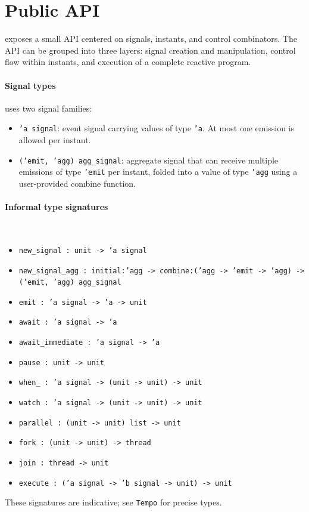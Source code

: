 \section{Public API}
\tempo{} exposes a small API centered on signals, instants, and control
combinators. The API can be grouped into three layers: signal creation and
manipulation, control flow within instants, and execution of a complete
reactive program.

\paragraph{Signal types}
\tempo{} uses two signal families:
\begin{itemize}
\item \texttt{'a signal}: event signal carrying values of type \texttt{'a}.
  At most one emission is allowed per instant.
\item \texttt{('emit, 'agg) agg\_signal}: aggregate signal that can receive
  multiple emissions of type \texttt{'emit} per instant, folded into a value
  of type \texttt{'agg} using a user-provided combine function.
\end{itemize}

\paragraph{Informal type signatures}\mbox{}\\
\begin{itemize}
\item \texttt{new\_signal : unit -> 'a signal}
\item \texttt{new\_signal\_agg : initial:'agg -> combine:('agg -> 'emit -> 'agg) -> ('emit, 'agg) agg\_signal}
\item \texttt{emit : 'a signal -> 'a -> unit}
\item \texttt{await : 'a signal -> 'a}
\item \texttt{await\_immediate : 'a signal -> 'a}
\item \texttt{pause : unit -> unit}
\item \texttt{when\_ : 'a signal -> (unit -> unit) -> unit}
\item \texttt{watch : 'a signal -> (unit -> unit) -> unit}
\item \texttt{parallel : (unit -> unit) list -> unit}
\item \texttt{fork : (unit -> unit) -> thread}
\item \texttt{join : thread -> unit}
\item \texttt{execute : ('a signal -> 'b signal -> unit) -> unit}
\end{itemize}
These signatures are indicative; see \texttt{Tempo} for precise types.

